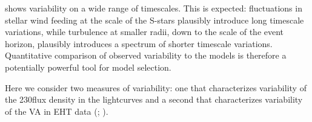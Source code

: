 \sgra shows variability on a wide range of timescales.  This is expected: fluctuations in stellar wind feeding at the scale of the S-stars plausibly introduce long timescale variations, while turbulence at smaller radii, down to the scale of the event horizon, plausibly introduces a spectrum of shorter timescale variations.  Quantitative comparison of observed variability to the models is therefore a potentially powerful tool for model selection.

Here we consider two measures of variability: one that characterizes variability of the 230\GHz flux density in the lightcurves \citep{Wielgus2022} and a second that characterizes variability of the VA in EHT data (; \citealt{NoiseModeling}).





